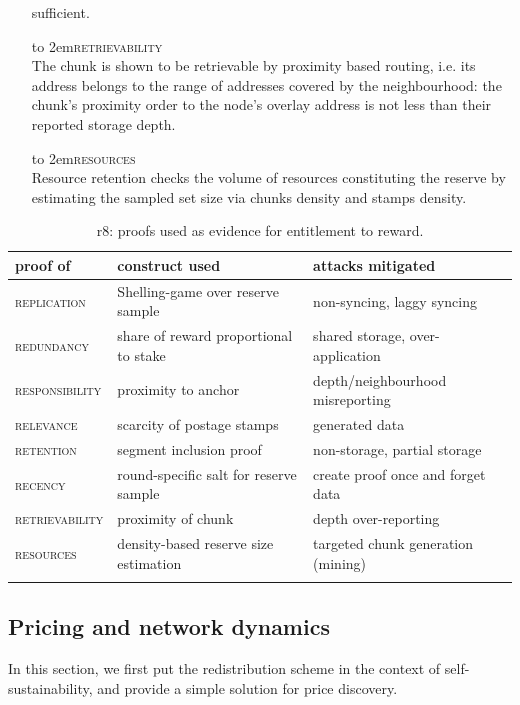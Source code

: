 \begin{itemize}[noitemsep]
sufficient.
\item[\hbox to 2em{\textsc{retrievability}}] \hspace{1cm}\\  The chunk is shown to be retrievable by proximity based routing, i.e. its address belongs to the range of addresses covered by the neighbourhood: the chunk's proximity order to the node's overlay address is not less than their reported storage depth. 
\item[\hbox to 2em{\textsc{resources}}] \hspace{1cm}\\ Resource retention checks the volume of resources constituting the reserve by estimating the sampled set size via chunks density and stamps density. 
\end{itemize}


{\small \begin{longtable}{l|p{}|p{}}
\toprule
 {proof of} & {construct used} & {attacks mitigated}\\\midrule
 \textsc{replication}& Shelling-game over reserve sample& non-syncing, laggy syncing\\
 \textsc{redundancy}& share of reward proportional to stake & shared storage, over-application\\
 \textsc{responsibility}& proximity to anchor & depth/neighbourhood misreporting \\
 \textsc{relevance}& scarcity of postage stamps & generated data \\
 \textsc{retention}& segment inclusion proof & non-storage, partial storage\\
 \textsc{recency}& round-specific salt for reserve sample & create proof once and forget data\\
 \textsc{retrievability}& proximity of chunk & depth over-reporting\\ 
 \textsc{resources}& density-based reserve size estimation & targeted chunk generation (mining) \\\bottomrule
  \caption[r8: proofs used as evidence for entitlement to reward]{r8: proofs used as evidence for entitlement to reward.}
\label{tab:gr8}
 \end{longtable}
 }


\subsection{Pricing and network dynamics}\label{sec:price-oracle}

In this section, we first put the redistribution scheme in the context of self-sustainability, and provide a simple solution for price discovery.


